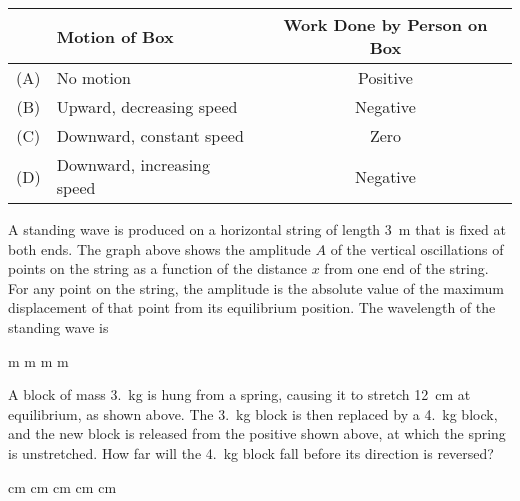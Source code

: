 \documentclass[12pt]{exam}
\newcommand{\pic}[2]{
  \begin{center}
    \texttt{[image: \#2]}
  \end{center}
}
\begin{document}
\begin{questions}
  \begin{tabular}{clc}
    & Motion of Box & Work Done by Person on Box \\
    \hline
    (A) & No motion                  & Positive \\
    (B) & Upward, decreasing speed   & Negative \\
    (C) & Downward, constant speed   & Zero     \\
    (D) & Downward, increasing speed & Negative
  \end{tabular}

  \question A standing wave is produced on a horizontal string of
  length \SI{3}{\metre} that is fixed at both ends. The graph above shows the
  amplitude $A$ of the vertical oscillations of points on the string as a
  function of the distance $x$ from one end of the string. For any point on the
  string, the amplitude is the absolute value of the maximum displacement of
  that point from its equilibrium position. The wavelength of the standing wave
  is
  \begin{choices}
     m
     m
     m
     m
  \end{choices}
  
  \uplevel{
    \pic{.27}{two-masses}
  }
  \question\vspace{-.2in} A block of mass \SI{3.}{\kilo\gram} is hung from a
  spring, causing it to stretch \SI{12}{\centi\metre} at equilibrium, as
  shown above. The \SI{3.}{\kilo\gram} block is then replaced by a
  \SI{4.}{\kilo\gram} block, and the new block is released from the positive
  shown above, at which the spring is unstretched. How far will the
  \SI{4.}{\kilo\gram} block fall before its direction is reversed?
  \begin{choices}
     cm
     cm
     cm
     cm
     cm
  \end{choices}
    

\end{questions}
\end{document}
